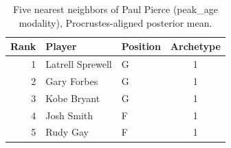 \begin{table}[htbp]
  \centering\small
  \begin{tabular}{rllc}
    \toprule
    Rank & Player & Position & Archetype \\
    \midrule
    1 & Latrell Sprewell & G & 1 \\
    2 & Gary Forbes & G & 1 \\
    3 & Kobe Bryant & G & 1 \\
    4 & Josh Smith & F & 1 \\
    5 & Rudy Gay & F & 1 \\
    \bottomrule
  \end{tabular}
  \caption{Five nearest neighbors of Paul Pierce (peak_age modality), Procrustes-aligned posterior mean.}
  \label{tab:Paul_Pierce_neighbors_peak_age}
\end{table}

